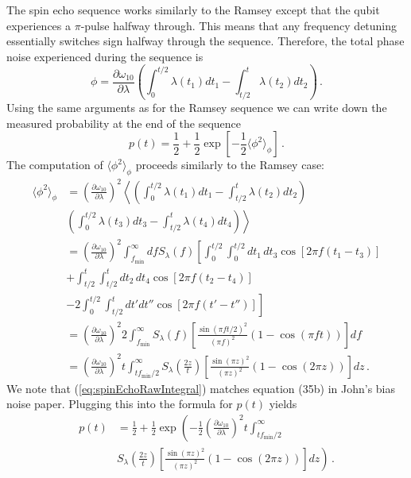 \documentclass{article}
\begin{document}
The spin echo sequence works similarly to the Ramsey except that the
qubit experiences a $\pi$-pulse halfway through.
This means that any frequency detuning essentially switches sign halfway through the sequence.
Therefore, the total phase noise experienced during the sequence is
\begin{equation}
\phi = \frac{\partial\omega_{10}}{\partial\lambda} \left( \int_0^{t/2} \lambda(t_1) dt_1 -\int_{t/2}^t \lambda(t_2) dt_2 \right) \, .
\end{equation}
Using the same arguments as for the Ramsey sequence we can write down the measured probability at the end of the sequence
\begin{equation}
p(t) = \frac{1}{2}+\frac{1}{2}\exp\left[-\frac{1}{2}\langle\phi^{2}\rangle_{\phi}\right] \, .
\end{equation}
The computation of $\langle\phi^{2}\rangle_{\phi}$ proceeds similarly to the Ramsey case:
\begin{align}
\langle\phi^{2}\rangle_{\phi}
&= \left( \frac{\partial\omega_{10}}{\partial\lambda} \right)^2 \left\langle \left( \int_0^{t/2} \lambda(t_1) dt_1 - \int_{t/2}^t \lambda(t_2) dt_2 \right) \right. \nonumber \\
& \left. \left( \int_0^{t/2} \lambda(t_3) dt_{3} - \int_{t/2}^t \lambda(t_4) dt_4 \right) \right \rangle \\
& = \left( \frac{\partial \omega_{10}}{\partial\lambda} \right)^2
\int_{f_{\textrm{min}}}^{\infty} df S_{\lambda}(f)
\left[
\int_0^{t/2} \int_0^{t/2} dt_1 \, dt_3 \cos[2\pi f (t_1 - t_3)] \right. \nonumber \\
& + \int_{t/2}^t \int_{t/2}^t dt_{2} \, dt_{4} \cos[2\pi f (t_2-t_4)] \nonumber \\
& - 2 \left. \int_{0}^{t/2}\int_{t/2}^{t} dt'dt'' \cos[2\pi f (t'-t'')] \right] \\
& = \left( \frac{\partial\omega_{10}}{\partial\lambda} \right)^2 2 \int_{f_{\textrm{min}}}^{\infty} S_\lambda (f) \left[ \frac{\sin\left(\pi ft/2\right)^2}{\left(\pi f\right)^2} \left( 1 - \cos \left( \pi f t \right) \right) \right]df \label{eq:spinEchoRawIntegral} \\
& = \left( \frac{\partial\omega_{10}}{\partial\lambda}\right)^2 t \int_{t f_{\textrm{min}}/2}^{\infty} S_\lambda \left( \frac{2z}{t} \right) \left[ \frac{\sin\left(\pi z\right)^{2}}{\left(\pi z\right)^2} \left(1 - \cos\left(2\pi z\right)\right)\right] dz \, .
\end{align}
We note that (\ref{eq:spinEchoRawIntegral}) matches equation (35b) in John's bias noise paper.
Plugging this into the formula for $p(t)$ yields
\begin{align}
p(t)
&= \frac{1}{2} + \frac{1}{2} \exp \left( - \frac{1}{2} \left( \frac{\partial\omega_{10}}{\partial\lambda} \right)^{2} t \int_{tf_{\textrm{min}}/2}^{\infty} \right. \nonumber \\
& \left. S_{\lambda} \left( \frac{2z}{t} \right) \left[ \frac{\sin\left(\pi z\right)^{2}}{\left(\pi z\right)^{2}} \left(1 - \cos\left(2\pi z\right)\right) \right] dz \right) \, .
\end{align}
\end{document}
